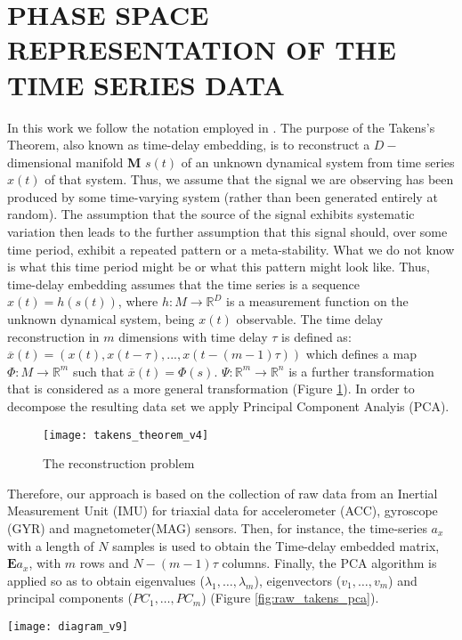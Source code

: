 \documentclass{sigchi}
\begin{document}
\section{PHASE SPACE REPRESENTATION OF THE TIME SERIES DATA}
In this work we follow the notation employed in \cite{Uzal2011}.
The purpose of the Takens's Theorem, also known as time-delay embedding, 
is to reconstruct a $D-$dimensional manifold \textbf{M} $s(t)$ of an unknown dynamical 
system from time series $x(t)$ of that system.
Thus, we assume that the signal we are observing has been produced by some time-varying system 
(rather than been generated entirely at random).  
The assumption that the source of the signal exhibits systematic variation then leads to the further 
assumption that this signal should, over some time period, exhibit a repeated pattern or a meta-stability.  
What we do not know is what this time period might be or what this pattern might look like.  
Thus, time-delay embedding assumes that the time series is a sequence $x(t)=h(s(t))$, 
where $h: M \rightarrow \mathbb{R}^D$ is a measurement function on the unknown dynamical system, 
being $x(t)$ observable.
The time delay reconstruction in $m$ dimensions with time delay $\tau$ is defined as:
$\overline{x}(t) = (x(t), x(t-\tau),...,x(t-(m-1)\tau))$ which defines a map
$\varPhi: M \rightarrow \mathbb{R}^m$ such that $\overline{x}(t) = \varPhi(s)$.
$\varPsi: \mathbb{R}^m \rightarrow \mathbb{R}^n$ is a further transformation that
is considered as a more general transformation (Figure \ref{fig:takens_theorem}).
In order to decompose the resulting data set we apply
Principal Component Analyis (PCA).
\begin{figure}[!htb]
\centering    
\texttt{[image: takens\_theorem\_v4]}
\caption[PA]{The reconstruction problem}
\label{fig:takens_theorem}
\end{figure}
Therefore, our approach is based on the collection of raw data from an 
Inertial Measurement Unit (IMU) for triaxial data 
for accelerometer (ACC), gyroscope (GYR) and magnetometer(MAG) sensors. 
Then, for instance, the time-series $a_x$ with a length of 
$N$ samples is used to obtain the Time-delay embedded matrix, 
$\boldsymbol{E} a_{x}$, with $m$ rows and $N-(m-1)\tau$ columns. 
Finally, the PCA algorithm is applied so as to obtain eigenvalues 
($\lambda_1,\ldots,\lambda_m$), eigenvectors ($v_1,\ldots,v_m$) and principal components 
($PC_1,\ldots,PC_m$) (Figure \ref{fig:raw_takens_pca}).
\begin{figure*}[!ht]
\centering    
\texttt{[image: diagram\_v9]}
\caption[PA]{Diagram for the Phase Space Reconstruction.}
\label{fig:raw_takens_pca}
\end{figure*}
\end{document}
